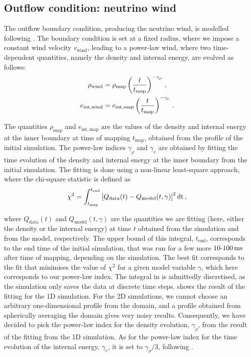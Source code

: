 \subsection{Outflow condition: neutrino wind} \label{sec:bdry_out}

The outflow boundary condition, producing the neutrino wind, is modelled following \cite{Wongwathanarat2015}. The boundary condition is set at a fixed radius, where we impose a constant wind velocity \(v_\mathrm{wind}\), leading to a power-law wind, where two time-dependent quantities, namely the density and internal energy, are evolved as follows:
\begin{gather}
    \rho_\mathrm{wind} = \rho_\mathrm{map} \left( \frac{t}{t_\mathrm{map}} \right)^{-\gamma_\rho} \label{eq:rho_wind} \punct{,} \\
    e_\mathrm{int,wind} = e_\mathrm{int,map} \left( \frac{t}{t_\mathrm{map}} \right)^{-\gamma_e} \label{eq:eint_wind} \punct{.}
\end{gather}

The quantities \(\rho_\mathrm{map}\) and \(e_\mathrm{int,map}\) are the values of the density and internal energy at the inner boundary at time of mapping \(t_\mathrm{map}\), obtained from the profile of the initial simulation. The power-law indices \(\gamma_\rho\) and \(\gamma_e\) are obtained by fitting the time evolution of the density and internal energy at the inner boundary from the initial simulation. The fitting is done using a non-linear least-square approach, where the chi-square statistic is defined as
\begin{equation}
    \chi^2 = \int_{t_\mathrm{map}}^{t_\mathrm{end}} \left[ Q_\mathrm{data}(t) - Q_\mathrm{model}(t, \gamma) \right]^2 \upd[t] \punct{,} \label{eq:chi_square}
\end{equation}

where \(Q_\mathrm{data}(t)\) and \(Q_\mathrm{model}(t, \gamma)\) are the quantities we are fitting (here, either the density or the internal energy) at time \(t\) obtained from the simulation and from the model, respectively. The upper bound of this integral, \(t_\mathrm{end}\), corresponds to the end time of the initial simulation, that was run for a few more \(10\text{-}100\units{ms}\) after time of mapping, depending on the simulation. The best fit corresponds to the fit that minimises the value of \(\chi^2\) for a given model variable \(\gamma\), which here corresponds to our power-law index. The integral in  is admittedly discretised, as the simulation only saves the data at discrete time steps.  shows the result of the fitting for the 1D simulation. For the 2D simulations, we cannot choose an arbitrary one-dimensional profile from the domain, and a profile obtained from spherically averaging the domain gives very noisy results. Consequently, we have decided to pick the power-law index for the density evolution, \(\gamma_\rho\), from the result of the fitting from the 1D simulation. As for the power-law index for the time evolution of the internal energy, \(\gamma_e\), it is set to \(\gamma_\rho / 3\), following \cite{Wongwathanarat2015}.

